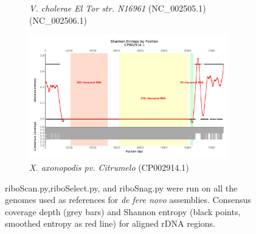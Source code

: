 \documentclass[10pt]{article}
\begin{document}
\begin{figure}
\begin{subfigure}[b]{.45\textwidth}
    \caption{\textit{V. cholerae El Tor str. N16961} (NC\_002505.1) (NC\_002506.1)}
    \label{fig:ent_vib}
  \end{subfigure}
  \begin{subfigure}[b]{.45\textwidth}
    \includegraphics[width=0.95\textwidth]{gage_entropy_figures/CP002914.1_entropy_plot}
    \caption{\textit{X. axonopodis pv. Citrumelo} (CP002914.1)}
  \end{subfigure}
  \caption{riboScan.py,riboSelect.py, and riboSnag.py were run on all the genomes used as references for \textit{de fere novo} assemblies. Consensus coverage depth (grey bars) and Shannon entropy (black points, smoothed entropy as red line) for aligned rDNA regions.}
  \label{fig:ent_gage}

\end{figure}
\end{document}
